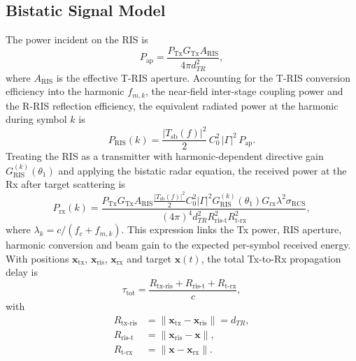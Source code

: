\documentclass[journal]{IEEEtran}
\newcommand{\Tris}{T-RIS}
\newcommand{\Rris}{R-RIS}
\begin{document}
\subsection{Bistatic Signal Model}
The power incident on the RIS is
\begin{equation}
P_{\mathrm{ap}} = \frac{P_{\mathrm{Tx}} G_{\mathrm{Tx}} A_{\mathrm{RIS}}}
{4\pi d_{TR}^2},
\label{eq:Pap}
\end{equation}
where $A_{\mathrm{RIS}}$ is the effective \Tris{} aperture. Accounting for
the \Tris{} conversion efficiency into the harmonic $f_{m,k}$, the near-field
inter-stage coupling power and the \Rris{} reflection efficiency, the
equivalent radiated power at the harmonic during symbol $k$ is
\begin{equation}
P_{\mathrm{RIS}}(k) = \frac{|T_{\mathrm{sb}}(f)|^2}{2}\,
C_0^2\,|\Gamma|^2\, P_{\mathrm{ap}}.
\label{eq:Pris}
\end{equation}
Treating the RIS as a transmitter with harmonic-dependent directive gain
$G_{\mathrm{RIS}}^{(k)}(\theta_1)$ and applying the bistatic radar equation,
the received power at the Rx after target scattering
is~\cite{willis2005bistatic,tang2020wireless}
\begin{equation}
P_{\mathrm{rx}}(k) =
\frac{P_{\mathrm{Tx}} G_{\mathrm{Tx}} A_{\mathrm{RIS}}
\frac{|T_{\mathrm{sb}}(f)|^2}{2} C_0^2 |\Gamma|^2
G_{\mathrm{RIS}}^{(k)}(\theta_1) G_{\mathrm{rx}} \lambda^2 \sigma_{\mathrm{RCS}}}
{(4\pi)^4 d_{TR}^2 R_{\mathrm{ris\text{-}t}}^2 R_{\mathrm{t\text{-}rx}}^2},
\label{eq:Prx}
\end{equation}
where $\lambda_k = c/(f_c + f_{m,k})$. This expression links the Tx power,
RIS aperture, harmonic conversion and beam gain to the expected per-symbol
received energy. With positions $\bm{x}_{\mathrm{tx}}$, $\bm{x}_{\mathrm{ris}}$,
$\bm{x}_{\mathrm{rx}}$ and target $\bm{x}(t)$, the total Tx-to-Rx
propagation delay is
\begin{equation}
\tau_{\mathrm{tot}} = \frac{R_{\mathrm{tx\text{-}ris}} +
R_{\mathrm{ris\text{-}t}} + R_{\mathrm{t\text{-}rx}}}{c},
\label{eq:tau}
\end{equation}
with
\begin{align}
R_{\mathrm{tx\text{-}ris}} &= \|\bm{x}_{\mathrm{tx}} - \bm{x}_{\mathrm{ris}}\| = d_{TR},
\label{eq:R1}\\
R_{\mathrm{ris\text{-}t}} &= \|\bm{x}_{\mathrm{ris}} - \bm{x}\|,
\label{eq:R2}\\
R_{\mathrm{t\text{-}rx}} &= \|\bm{x} - \bm{x}_{\mathrm{rx}}\|.
\label{eq:R3}
\end{align}
\end{document}
